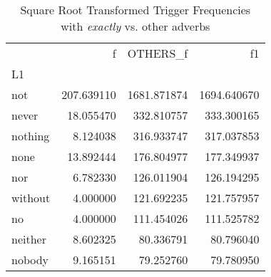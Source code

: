 
\begin{table}[ht]
\caption{Square Root Transformed Trigger Frequencies\\with \textit{exactly} vs. other adverbs}
\label{trig-exactly-others}
\begin{tabular}{lrrr}
\toprule
 & f & OTHERS\_f & f1 \\
L1 &  &  &  \\
\midrule
not & {\cellcolor[HTML]{081D58}} \color[HTML]{F1F1F1} 207.639110 & {\cellcolor[HTML]{081D58}} \color[HTML]{F1F1F1} 1681.871874 & {\cellcolor[HTML]{081D58}} \color[HTML]{F1F1F1} 1694.640670 \\
never & {\cellcolor[HTML]{F4FBC0}} \color[HTML]{000000} 18.055470 & {\cellcolor[HTML]{DCF1B2}} \color[HTML]{000000} 332.810757 & {\cellcolor[HTML]{DCF1B2}} \color[HTML]{000000} 333.300165 \\
nothing & {\cellcolor[HTML]{FAFDCF}} \color[HTML]{000000} 8.124038 & {\cellcolor[HTML]{DFF2B2}} \color[HTML]{000000} 316.933747 & {\cellcolor[HTML]{E0F3B2}} \color[HTML]{000000} 317.037853 \\
none & {\cellcolor[HTML]{F7FCC6}} \color[HTML]{000000} 13.892444 & {\cellcolor[HTML]{F3FABD}} \color[HTML]{000000} 176.804977 & {\cellcolor[HTML]{F3FABD}} \color[HTML]{000000} 177.349937 \\
nor & {\cellcolor[HTML]{FCFED1}} \color[HTML]{000000} 6.782330 & {\cellcolor[HTML]{F7FCC7}} \color[HTML]{000000} 126.011904 & {\cellcolor[HTML]{F7FCC7}} \color[HTML]{000000} 126.194295 \\
without & {\cellcolor[HTML]{FDFED5}} \color[HTML]{000000} 4.000000 & {\cellcolor[HTML]{F8FCC9}} \color[HTML]{000000} 121.692235 & {\cellcolor[HTML]{F8FCC9}} \color[HTML]{000000} 121.757957 \\
no & {\cellcolor[HTML]{FDFED5}} \color[HTML]{000000} 4.000000 & {\cellcolor[HTML]{F8FCCA}} \color[HTML]{000000} 111.454026 & {\cellcolor[HTML]{F8FCCA}} \color[HTML]{000000} 111.525782 \\
neither & {\cellcolor[HTML]{FAFDCF}} \color[HTML]{000000} 8.602325 & {\cellcolor[HTML]{FBFDD0}} \color[HTML]{000000} 80.336791 & {\cellcolor[HTML]{FBFDD0}} \color[HTML]{000000} 80.796040 \\
nobody & {\cellcolor[HTML]{FAFDCE}} \color[HTML]{000000} 9.165151 & {\cellcolor[HTML]{FBFDD0}} \color[HTML]{000000} 79.252760 & {\cellcolor[HTML]{FBFDD0}} \color[HTML]{000000} 79.780950 \\

\end{tabular}
\end{table}
